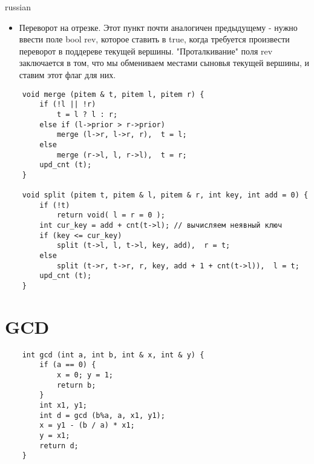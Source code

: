 \documentclass{article}
\begin{document}
\begin{otherlanguage*}{russian}
\begin{itemize}
    \item Переворот на отрезке.
    Этот пункт почти аналогичен предыдущему - нужно ввести поле bool rev, которое ставить в true, когда требуется произвести переворот в поддереве текущей вершины. "Проталкивание" поля rev заключается в том, что мы обмениваем местами сыновья текущей вершины, и ставим этот флаг для них.
    \end{itemize}
\end{otherlanguage*}
\begin{verbatim}
    void merge (pitem & t, pitem l, pitem r) {
        if (!l || !r)
            t = l ? l : r;
        else if (l->prior > r->prior)
            merge (l->r, l->r, r),  t = l;
        else
            merge (r->l, l, r->l),  t = r;
        upd_cnt (t);
    }

    void split (pitem t, pitem & l, pitem & r, int key, int add = 0) {
        if (!t)
            return void( l = r = 0 );
        int cur_key = add + cnt(t->l); // вычисляем неявный ключ
        if (key <= cur_key)
            split (t->l, l, t->l, key, add),  r = t;
        else
            split (t->r, t->r, r, key, add + 1 + cnt(t->l)),  l = t;
        upd_cnt (t);
    }
\end{verbatim}

\section{GCD}
\begin{verbatim}
    int gcd (int a, int b, int & x, int & y) {
        if (a == 0) {
            x = 0; y = 1;
            return b;
        }
        int x1, y1;
        int d = gcd (b%a, a, x1, y1);
        x = y1 - (b / a) * x1;
        y = x1;
        return d;
    }
\end{verbatim}
\end{document}
